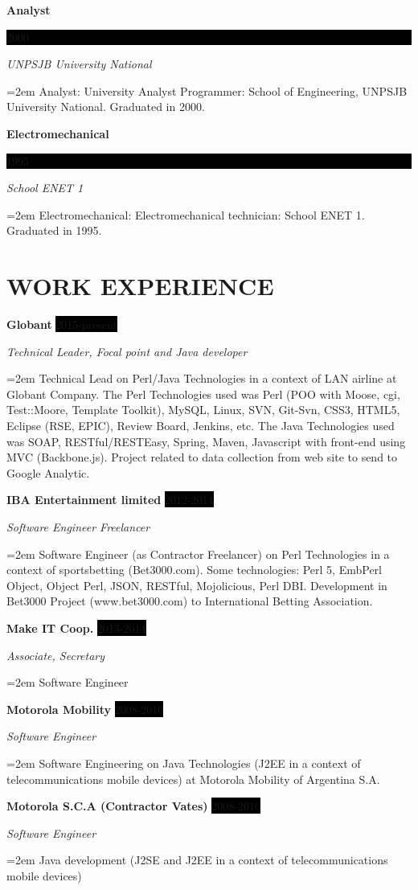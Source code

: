 \documentclass[paper=a4,fontsize=11pt]{scrartcl} %
\newcommand{\sepspace}{\vspace*{1em}}		%
\newcommand{\NewPart}[1]{\section*{\uppercase{#1}}}
\newcommand{\EducationEntry}[4]{ %
		\noindent \textbf{#1} \hfill      %
		\colorbox{Black}{%
			\parbox{6em}{%
			\hfill\color{White}#2}} \par  %
		\noindent \textit{#3} \par        %
		\noindent\hangindent=2em\hangafter=0 \small #4 %
		\normalsize \par}
\newcommand{\WorkEntry}[4]{				  %
		\noindent \textbf{#1} \hfill      %
		\colorbox{Black}{\color{White}#2} \par  %
		\noindent \textit{#3} \par              %
		\noindent\hangindent=2em\hangafter=0 \small #4 %
		\normalsize \par}
\begin{document}
\EducationEntry{Analyst}{2000}{UNPSJB University National}{Analyst: University Analyst Programmer: School of Engineering, UNPSJB University National. Graduated in 2000.}
\sepspace

\EducationEntry{Electromechanical}{1995}{School ENET 1}{Electromechanical: Electromechanical technician: School ENET 1. Graduated in 1995.}
\sepspace

\NewPart{Work experience}{}

\WorkEntry{Globant}{2015-present}{Technical Leader, Focal point and Java developer}
{Technical Lead on Perl/Java Technologies in a context of LAN airline at Globant Company. The Perl Technologies used was Perl (POO with Moose, cgi, Test::Moore, Template Toolkit), MySQL, Linux, SVN, Git-Svn, CSS3, HTML5, Eclipse (RSE, EPIC), Review Board, Jenkins, etc. The Java Technologies used was SOAP, RESTful/RESTEasy, Spring, Maven, Javascript with front-end using MVC (Backbone.js). Project related to data collection from web site to send to Google Analytic.}
\sepspace

\WorkEntry{IBA Entertainment limited}{2012-2014}{Software Engineer Freelancer}
{Software Engineer (as Contractor Freelancer) on Perl Technologies in a context of sportsbetting (Bet3000.com). Some technologies: Perl 5, EmbPerl Object, Object Perl, JSON, RESTful, Mojolicious, Perl DBI. Development in Bet3000 Project (www.bet3000.com) to International Betting Association.}
\sepspace

\WorkEntry{Make IT Coop.}{2013-2014}{Associate, Secretary}{
Software Engineer}
\sepspace

\WorkEntry{Motorola Mobility}{2008-2010}{Software Engineer}
{Software Engineering on Java Technologies (J2EE in a context of telecommunications mobile devices) at Motorola Mobility of Argentina S.A.}
\sepspace

\WorkEntry{Motorola S.C.A (Contractor Vates)}{2008-2010}{Software Engineer}
{Java development (J2SE and J2EE in a context of telecommunications mobile devices)}
\sepspace
\end{document}
